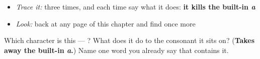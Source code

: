 \begin{quote}
\end{quote}

\begin{itemize}
\raggedright
  \item \emph{Trace it:}  three times, and each time say what it does: \textbf{it kills the built-in \emph{a}}
  \item \emph{Look:} back at any page of this chapter and find  once more
\end{itemize}

\begin{tcolorbox}[breakable,colback=teal!4,colframe=teal!35!black,title={Before you move on}]
Which character is this — ? What does it do to the consonant it sits on? (\textbf{Takes away the built-in \emph{a}.}) Name one word you already say that contains it.
\end{tcolorbox}
